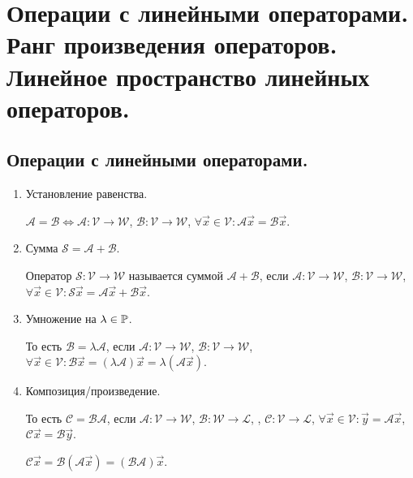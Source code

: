 \section{
    Операции с линейными операторами. Ранг произведения операторов. Линейное пространство линейных операторов.
}

\subsection{
    Операции с линейными операторами.
}

\begin{enumerate}
    \item Установление равенства.

    $\mathscr{A} = \mathscr{B} \iff \mathscr{A} \colon \mathcal{V} \to \mathcal{W}$, $\mathscr{B} \colon \mathcal{V} \to \mathcal{W}$, $\forall \vec{x} \in \mathcal{V} \colon \mathscr{A}\vec{x} = \mathscr{B}\vec{x}$.

    \item Сумма $\mathscr{S} = \mathscr{A} + \mathscr{B}$.
    
    Оператор $\mathscr{S} \colon \mathcal{V} \to \mathcal{W}$ называется суммой $\mathscr{A} + \mathscr{B}$, если $\mathscr{A} \colon \mathcal{V} \to \mathcal{W}$, $\mathscr{B} \colon \mathcal{V} \to \mathcal{W}$, $\forall \vec{x} \in \mathcal{V} \colon \mathscr{S}\vec{x} = \mathscr{A}\vec{x} + \mathscr{B}\vec{x}$.

    \item Умножение на $\lambda \in \mathbb{P}$.

    То есть $\mathscr{B} = \lambda \mathscr{A}$, если $\mathscr{A} \colon \mathcal{V} \to \mathcal{W}$, $\mathscr{B} \colon \mathcal{V} \to \mathcal{W}$, $\forall \vec{x} \in \mathcal{V} \colon \mathscr{B}\vec{x} = (\lambda\mathscr{A})\vec{x} = \lambda(\mathscr{A}\vec{x})$.

    \item Композиция/произведение.

    То есть $\mathscr{C} = \mathscr{B}\mathscr{A}$, если $\mathscr{A} \colon \mathcal{V} \to \mathcal{W}$, $\mathscr{B} \colon \mathcal{W} \to \mathcal{L}$, , $\mathscr{C} \colon \mathcal{V} \to \mathcal{L}$, $\forall \vec{x} \in \mathcal{V} \colon \vec{y} = \mathscr{A}\vec{x}$, $\mathscr{C}\vec{x} = \mathscr{B}\vec{y}$.

    $\mathscr{C}\vec{x} = \mathscr{B}(\mathscr{A}\vec{x}) = (\mathscr{B}\mathscr{A})\vec{x}$.
\end{enumerate}


